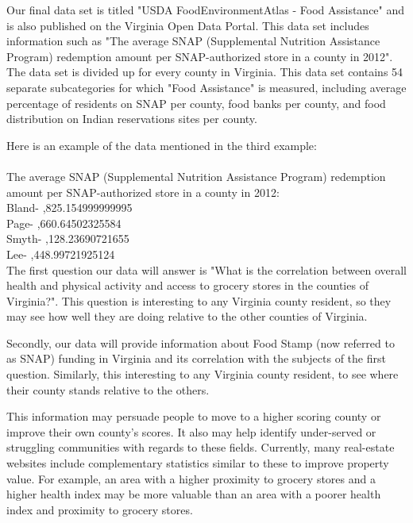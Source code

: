 \documentclass[11pt]{article}
\begin{document}
Our final data set is titled "USDA FoodEnvironmentAtlas - Food Assistance" and is also published on the Virginia Open Data Portal. This data set includes information such as "The average SNAP (Supplemental Nutrition Assistance Program) redemption amount per SNAP-authorized store in a county in 2012". The data set is divided up for every county in Virginia. This data set contains 54 separate subcategories for which "Food Assistance" is measured, including average percentage of residents on SNAP per county, food banks per county, and food distribution on Indian reservations sites per county.


Here is an example of the data mentioned in the third example:\\
\\The average SNAP (Supplemental Nutrition Assistance Program) redemption amount per SNAP-authorized store in a county in 2012:\\
Bland- ,825.154999999995\\
Page-  ,660.64502325584\\
Smyth- ,128.23690721655\\
Lee-   ,448.99721925124\\


 


The first question our data will answer is "What is the correlation between overall health and physical activity and access to grocery stores in the counties of Virginia?". This question is interesting to any Virginia county resident, so they may see how well they are doing relative to the other counties of Virginia. 

Secondly, our data will provide information about Food Stamp (now referred to as SNAP) funding in Virginia and its correlation with the subjects of the first question. Similarly, this interesting to any Virginia county resident, to see where their county stands relative to the others.  

This information may persuade people to move to a higher scoring county or improve their own county's scores. It also may help identify under-served or struggling communities with regards to these fields. Currently, many real-estate websites include complementary statistics similar to these to improve property value. For example, an area with a higher proximity to grocery stores and a higher health index may be more valuable than an area with a poorer health index and proximity to grocery stores.
\end{document}
